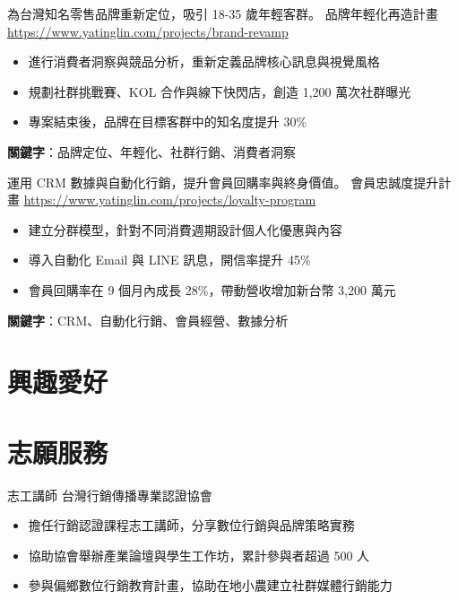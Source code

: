 \documentclass[a4paper, serif, 10pt]{moderncv}
\begin{document}
        {為台灣知名零售品牌重新定位，吸引 18-35 歲年輕客群。}
        {品牌年輕化再造計畫}
        {\url{https://www.yatinglin.com/projects/brand-revamp}}
        {}
        {\begin{itemize}
\item 進行消費者洞察與競品分析，重新定義品牌核心訊息與視覺風格
\item 規劃社群挑戰賽、KOL 合作與線下快閃店，創造 1,200 萬次社群曝光
\item 專案結束後，品牌在目標客群中的知名度提升 30\%
\end{itemize}
\textbf{關鍵字}：品牌定位、年輕化、社群行銷、消費者洞察}

        {運用 CRM 數據與自動化行銷，提升會員回購率與終身價值。}
        {會員忠誠度提升計畫}
        {\url{https://www.yatinglin.com/projects/loyalty-program}}
        {}
        {\begin{itemize}
\item 建立分群模型，針對不同消費週期設計個人化優惠與內容
\item 導入自動化 Email 與 LINE 訊息，開信率提升 45\%
\item 會員回購率在 9 個月內成長 28\%，帶動營收增加新台幣 3,200 萬元
\end{itemize}
\textbf{關鍵字}：CRM、自動化行銷、會員經營、數據分析}
\section{興趣愛好}

\section{志願服務}

        {志工講師}
        {台灣行銷傳播專業認證協會}
        {}
        {}
        {\begin{itemize}
\item 擔任行銷認證課程志工講師，分享數位行銷與品牌策略實務
\item 協助協會舉辦產業論壇與學生工作坊，累計參與者超過 500 人
\item 參與偏鄉數位行銷教育計畫，協助在地小農建立社群媒體行銷能力
\end{itemize}}
    
\end{document}
